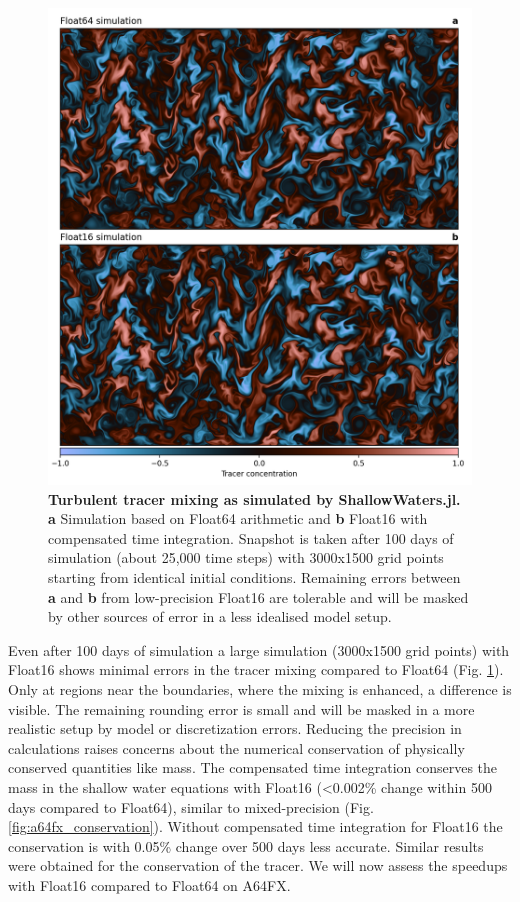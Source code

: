 \begin{figure}[tbhp]
	\includegraphics[width=1\textwidth]{Figures/a64fx/frame_hr_0199.png}
	\caption{\textbf{Turbulent tracer mixing as simulated by ShallowWaters.jl. a}
	Simulation based on Float64 arithmetic and \textbf{b} Float16 with compensated time integration.
	Snapshot is taken after 100 days of simulation (about 25,000 time steps) with 3000x1500 grid points
	starting from identical initial conditions. Remaining errors between \textbf{a} and \textbf{b} from
	low-precision Float16 are tolerable and will be masked by other sources of error in a less
	idealised model setup.}
	\label{fig:a64fx_tracermixing}
\end{figure}

Even after 100 days of simulation a large simulation (3000x1500 grid points) with Float16 shows minimal errors in
the tracer mixing compared to Float64 (Fig. \ref{fig:a64fx_tracermixing}). Only at regions near the boundaries,
where the mixing is enhanced, a difference is visible. The remaining rounding error is small and will be masked
in a more realistic setup by model or discretization errors. Reducing the precision in calculations raises concerns
about the numerical conservation of physically conserved quantities like mass. The compensated time integration
conserves the mass in the shallow water equations with Float16 (<0.002\% change within 500 days compared to Float64),
similar to mixed-precision (Fig. \ref{fig:a64fx_conservation}). Without compensated time integration for Float16 the conservation is with
0.05\% change over 500 days less accurate. Similar results were obtained for the conservation of the tracer.
We will now assess the speedups with Float16 compared to Float64 on A64FX.

